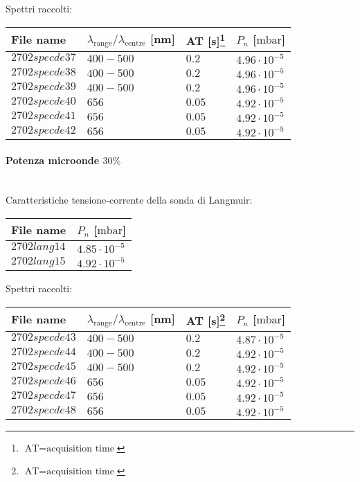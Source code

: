 Spettri raccolti:
\begin{center}
\begin{tabular}{p{3cm}p{4cm}p{2cm}p{3cm}}
\toprule
File name	&$\lambda_\text{range}\text{/}\lambda_\text{centre}$ [nm] &AT [s]\footnote{$\text{AT}=\text{acquisition time}$} &$P_{n}$ [$\si{\milli\bar}$]\\
\midrule
$2702specde37$	&$400-500$	&$0.2$		&$4.96\cdot10^{-5}$\\
$2702specde38$	&$400-500$	&$0.2$		&$4.96\cdot10^{-5}$\\
$2702specde39$	&$400-500$	&$0.2$		&$4.96\cdot10^{-5}$\\
$2702specde40$	&$656$		&$0.05$		&$4.92\cdot10^{-5}$\\
$2702specde41$	&$656$		&$0.05$		&$4.92\cdot10^{-5}$\\
$2702specde42$	&$656$		&$0.05$		&$4.92\cdot10^{-5}$\\

\bottomrule
\end{tabular}
\end{center}

\paragraph*{Potenza microonde $\text{30\%}$} ~\\
Caratteristiche tensione-corrente della sonda di Langmuir:
\begin{center}
  \begin{tabular}{p{3cm}p{3cm}}
  \toprule
File name	&$P_{n}$ [$\si{\milli\bar}$]\\
  \midrule
$2702lang14$	&$4.85\cdot10^{-5}$\\
$2702lang15$	&$4.92\cdot10^{-5}$\\

  \bottomrule
  \end{tabular}
\end{center}

Spettri raccolti:
\begin{center}
\begin{tabular}{p{3cm}p{4cm}p{2cm}p{3cm}}
\toprule
File name	&$\lambda_\text{range}\text{/}\lambda_\text{centre}$ [nm] &AT [s]\footnote{$\text{AT}=\text{acquisition time}$} &$P_{n}$ [$\si{\milli\bar}$]\\
\midrule
$2702specde43$	&$400-500$	&$0.2$		&$4.87\cdot10^{-5}$\\
$2702specde44$	&$400-500$	&$0.2$		&$4.92\cdot10^{-5}$\\
$2702specde45$	&$400-500$	&$0.2$		&$4.92\cdot10^{-5}$\\
$2702specde46$	&$656$		&$0.05$		&$4.92\cdot10^{-5}$\\
$2702specde47$	&$656$		&$0.05$		&$4.92\cdot10^{-5}$\\
$2702specde48$	&$656$		&$0.05$		&$4.92\cdot10^{-5}$\\

\bottomrule
\end{tabular}
\end{center}

